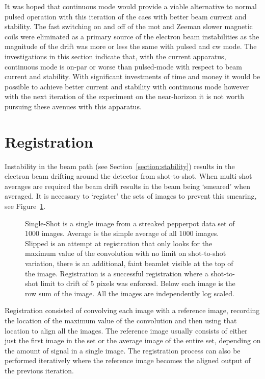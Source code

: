 It was hoped that continuous mode would provide a viable alternative to normal pulsed operation with this iteration of the \gls{caes} with better beam current and stability.
The fast switching on and off of the \gls{mot} and Zeeman slower magnetic coils were eliminated as a primary source of the electron beam instabilities as the magnitude of the drift was more or less the same with pulsed and \gls{cw} mode.
The investigations in this section indicate that, with the current apparatus, continuous mode is on-par or worse than pulsed-mode with respect to beam current and stability.
With significant investments of time and money it would be possible to achieve better current and stability with continuous mode however with the next iteration of the experiment on the near-horizon it is not worth pursuing these avenues with this apparatus.

\section{Registration}\label{section:registration}

Instability in the beam path (see Section~\ref{section:stability}) results in the electron beam drifting around the detector from shot-to-shot.
When multi-shot averages are required the beam drift results in the beam being `smeared' when averaged.
It is necessary to `register' the sets of images to prevent this smearing, see Figure~\ref{figure:registration_examples}.

\begin{figure}
    \center
    
    \caption[Image registration examples.]{Single-Shot is a single image from a streaked pepperpot data set of 1000 images. Average is the simple average of all 1000 images. Slipped is an attempt at registration that only looks for the maximum value of the convolution with no limit on shot-to-shot variation, there is an additional, faint beamlet visible at the top of the image. Registration is a successful registration where a shot-to-shot limit to drift of 5 pixels was enforced. Below each image is the row sum of the image. All the images are independently log scaled.}
    \label{figure:registration_examples}
\end{figure}

Registration consisted of convolving each image with a reference image, recording the location of the maximum value of the convolution and then using that location to align all the images.
The reference image usually consists of either just the first image in the set or the average image of the entire set, depending on the amount of signal in a single image.
The registration process can also be performed iteratively where the reference image becomes the aligned output of the previous iteration.

